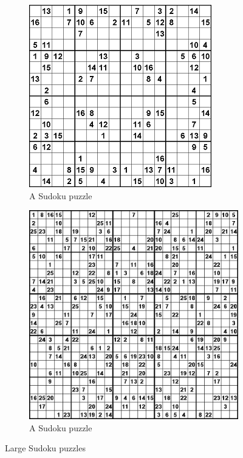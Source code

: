 \documentclass[12pt,a4paper]{article}
\begin{document}
\begin{figure}[H]
	\centering
	\begin{subfigure}{.5\textwidth}
		\centering
		\includegraphics[height=0.95\linewidth]{16x16_puzzle}
		\caption{A  Sudoku puzzle}
		\label{fig:sub1}
	\end{subfigure}%
	\begin{subfigure}{.5\textwidth}
		\centering
		\includegraphics[height=0.95\linewidth]{25x25_puzzle}
		\caption{A  Sudoku puzzle}
		\label{fig:sub2}
	\end{subfigure}
	\caption{Large Sudoku puzzles}
	\label{fig:large-Sudoku-puzzles}
\end{figure}
\end{document}
